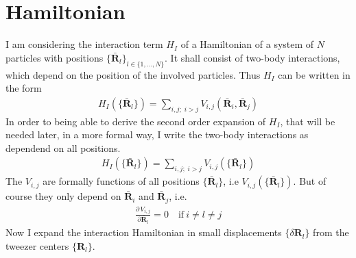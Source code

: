 \section*{Hamiltonian}
I am considering the interaction term $H_I$ of a Hamiltonian of a system of $N$ particles with positions $\{\bar{\mathbf{R}}_l\}_{l\in\{1,\dots,N\}}$. It shall consist of two-body interactions, which depend on the position of the involved particles. Thus $H_I$ can be written in the form
\begin{align*}
    H_I(\{\bar{\mathbf{R}}_l\}) = \sum_{i,j;\;i> j}V_{i,j}(\bar{\mathbf{R}}_i,\bar{\mathbf{R}}_j)
\end{align*}
In order to being able to derive the second order expansion of $H_I$, that will be needed later, in a more formal way, I write the two-body interactions as dependend on all positions.
\begin{align*}
    H_I(\{\bar{\mathbf{R}}_l\}) = \sum_{i,j;\;i> j}V_{i,j}(\{\bar{\mathbf{R}}_l\})
\end{align*}
The $V_{i,j}$ are formally functions of all positions $\{\bar{\mathbf{R}}_l\}$, i.e $V_{i,j}(\{\bar{\mathbf{R}}_l\})$. But of course they only depend on $\bar{\mathbf{R}}_i$ and $\bar{\mathbf{R}}_j$, i.e.
\begin{align*}
    \frac{\partial\,V_{i,j}}{\partial \bar{\mathbf{R}}_l } = 0\quad\text{if}\:i\neq l\neq j
\end{align*}
Now I expand the interaction Hamiltonian in small displacements $\{\delta\mathbf{R}_l\}$ from the tweezer centers $\{\mathbf{R}_l\}$. 
